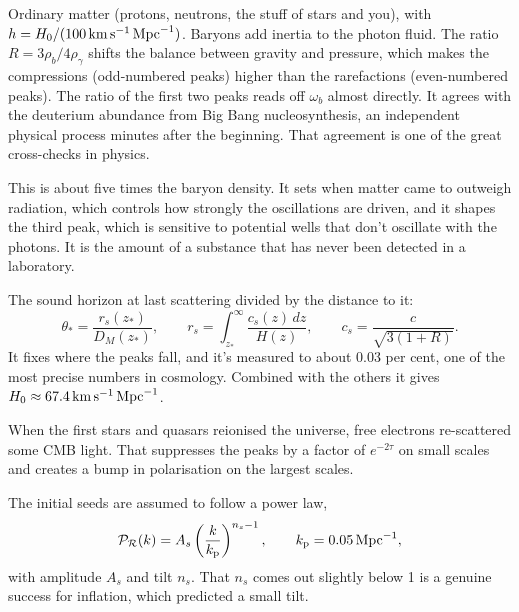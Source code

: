 \begin{description}[leftmargin=1em,style=nextline]
\item[1. $\omega_b=\Omega_bh^2\approx0.0224$, the baryon density.] Ordinary matter (protons, neutrons, the stuff of stars and you), with $h=H_0/(100\,\mathrm{km\,s^{-1}}\,\mathrm{Mpc}^{-1})$. Baryons add inertia to the photon fluid. The ratio $R=3\rho_b/4\rho_\gamma$ shifts the balance between gravity and pressure, which makes the compressions (odd-numbered peaks) higher than the rarefactions (even-numbered peaks). The ratio of the first two peaks reads off $\omega_b$ almost directly. It agrees with the deuterium abundance from Big Bang nucleosynthesis, an independent physical process minutes after the beginning. That agreement is one of the great cross-checks in physics.
\item[2. $\omega_c=\Omega_ch^2\approx0.120$, the cold dark matter density.] This is about five times the baryon density. It sets when matter came to outweigh radiation, which controls how strongly the oscillations are driven, and it shapes the third peak, which is sensitive to potential wells that don't oscillate with the photons. It is the amount of a substance that has never been detected in a laboratory.
\item[3. $\theta_*\approx1.041\times10^{-2}$, the acoustic angle.] The sound horizon at last scattering divided by the distance to it:
\begin{equation}
\theta_*=\frac{r_s(z_*)}{D_M(z_*)},\qquad r_s=\int_{z_*}^{\infty}\frac{c_s(z)\,dz}{H(z)},\qquad c_s=\frac{c}{\sqrt{3(1+R)}}.
\end{equation}
It fixes where the peaks fall, and it's measured to about 0.03 per cent, one of the most precise numbers in cosmology. Combined with the others it gives $H_0\approx67.4\,\mathrm{km\,s^{-1}}\,\mathrm{Mpc}^{-1}$.
\item[4. $\tau\approx0.054$, the optical depth to reionisation.] When the first stars and quasars reionised the universe, free electrons re-scattered some CMB light. That suppresses the peaks by a factor of $e^{-2\tau}$ on small scales and creates a bump in polarisation on the largest scales.
\item[5 and 6. $A_s\approx2.1\times10^{-9}$ and $n_s\approx0.965$, the primordial fluctuations.] The initial seeds are assumed to follow a power law,
\begin{equation}
\mathcal{P}_\mathcal{R}(k)=A_s\left(\frac{k}{k_{\rm p}}\right)^{n_s-1},\qquad k_{\rm p}=0.05\,\mathrm{Mpc}^{-1},
\end{equation}
with amplitude $A_s$ and tilt $n_s$. That $n_s$ comes out slightly below 1 is a genuine success for inflation, which predicted a small tilt.
\end{description}

